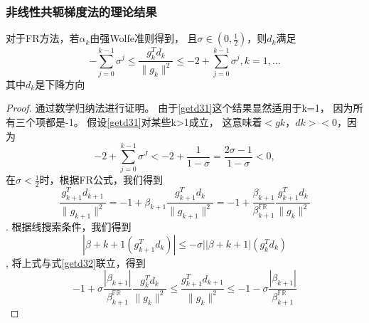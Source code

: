        \subsubsection{非线性共轭梯度法的理论结果}\cite{1992Global}
        \begin{theorem}\label{71}
            对于FR方法，若$\alpha_k$由强Wolfe准则得到，
            且$\sigma\in(0,\frac{1}{2})$，则$d_k$满足
            \begin{equation}\label{getd31}
                -\displaystyle\sum^{k-1}_{j=0}\sigma^j \leq
                \displaystyle\frac{g_k^Td_k}{\|g_k\|^2}\leq
                -2 + \displaystyle\sum^{k-1}_{j=0}\sigma^j, k = 1,...
            \end{equation}其中$d_k$是下降方向
        \end{theorem}
        \begin{proof}   
            通过数学归纳法进行证明。
            由于\ref{getd31}这个结果显然适用于k=1，
            因为所有三个项都是-1。
            假设\ref{getd31}对某些k>1成立，
            这意味着$<gk，dk><0$，因为
            \begin{equation}
                -2 + \displaystyle\sum^{k-1}_{j=0}\sigma^J < 
                -2 + \frac{1}{1-\sigma} = 
                \frac{2\sigma-1}{1-\sigma} < 0,
            \nonumber
            \end{equation}
            在$\sigma < \frac{1}{2}$时，根据FR公式，我们得到
            \begin{equation}\label{getd32}
                \displaystyle\frac{g_{k+1}^Td_{k+1}}{\|g_{k+1}\|^2} = 
                -1 + \beta_{k+1}\displaystyle\frac{g_{k+1}^Td_k}{\|g_{k+1}\|^2} = 
                -1 + \displaystyle\frac{\beta_{k+1}}{\beta_{k+1}^{\mathbb{FR}}}
                \displaystyle\frac{g_{k+1}^Td_k}{\|g_{k}\|^2}
            \nonumber
            \end{equation}.
            根据线搜索条件，我们得到
            \begin{equation}
                |\beta+{k+1}(g_{k+1}^Td_k)| \leq -\sigma||\beta+{k+1}|(g_{k}^Td_k)
            \nonumber
            \end{equation},
            将上式与式\ref{getd32}联立，得到
            \begin{equation}
                -1 + \sigma \displaystyle\frac{|\beta_{k+1}|}{\beta_{k+1}^{\mathbb{FR}}}
                \displaystyle\frac{g_{k}^Td_k}{\|g_{k}\|^2}
                \leq
                \displaystyle\frac{g_{k+1}^Td_{k+1}}{\|g_{k}\|^2}
                \leq
                -1 - \sigma \displaystyle\frac{|\beta_{k+1}|}{\beta_{k+1}^{\mathbb{FR}}}

\end{equation}
\end{proof}
